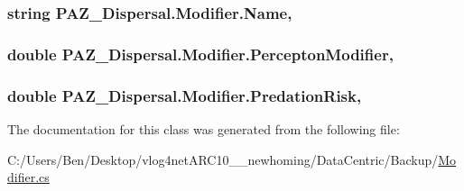 \hypertarget{class_p_a_z___dispersal_1_1_modifier_a00e78bf43c3612ed5be4e41c4b5ebdb7}{
\subsubsection[{Name}]{\setlength{\rightskip}{0pt plus 5cm}string P\-A\-Z\-\_\-\-Dispersal.\-Modifier.\-Name\hspace{0.3cm}{\ttfamily [get]}, {\ttfamily [set]}}}\label{class_p_a_z___dispersal_1_1_modifier_a00e78bf43c3612ed5be4e41c4b5ebdb7}
\hypertarget{class_p_a_z___dispersal_1_1_modifier_aa83b2dd503738906d8d06cf0b1f24a14}{
\subsubsection[{Percepton\-Modifier}]{\setlength{\rightskip}{0pt plus 5cm}double P\-A\-Z\-\_\-\-Dispersal.\-Modifier.\-Percepton\-Modifier\hspace{0.3cm}{\ttfamily [get]}, {\ttfamily [set]}}}\label{class_p_a_z___dispersal_1_1_modifier_aa83b2dd503738906d8d06cf0b1f24a14}
\hypertarget{class_p_a_z___dispersal_1_1_modifier_ac7b22db668e3d7e6d354487a03b5b690}{
\subsubsection[{Predation\-Risk}]{\setlength{\rightskip}{0pt plus 5cm}double P\-A\-Z\-\_\-\-Dispersal.\-Modifier.\-Predation\-Risk\hspace{0.3cm}{\ttfamily [get]}, {\ttfamily [set]}}}\label{class_p_a_z___dispersal_1_1_modifier_ac7b22db668e3d7e6d354487a03b5b690}


The documentation for this class was generated from the following file\-:\begin{DoxyCompactItemize}
\item 
C\-:/\-Users/\-Ben/\-Desktop/vlog4net\-A\-R\-C10\-\_\-\_\-newhoming/\-Data\-Centric/\-Backup/\hyperlink{_backup_2_modifier_8cs}{Modifier.\-cs}\end{DoxyCompactItemize}
